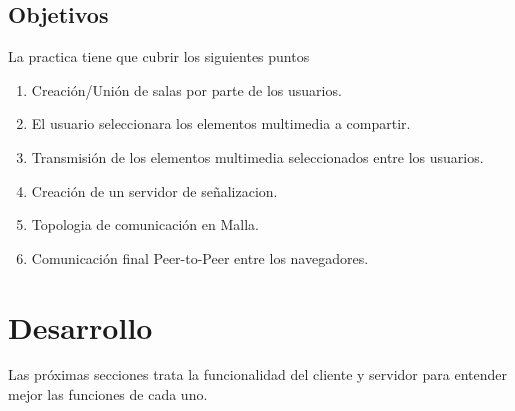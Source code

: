 \subsection{Objetivos}
La practica tiene que cubrir los siguientes puntos
\begin{enumerate}
\item Creación/Unión de salas por parte de los usuarios.
\item El usuario seleccionara los elementos multimedia a compartir.
\item Transmisión de los elementos multimedia seleccionados entre los usuarios.
\item Creación de un servidor de señalizacion.
\item Topologia de comunicación en Malla.
\item Comunicación final Peer-to-Peer entre los navegadores.
\end{enumerate}
\section{Desarrollo}
Las próximas secciones trata la funcionalidad del cliente y servidor para entender mejor las funciones de cada uno.
